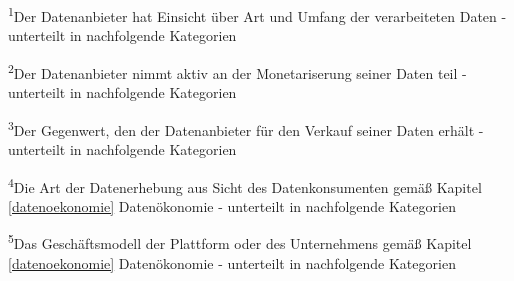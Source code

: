 \noindent \textsuperscript{1}Der Datenanbieter hat Einsicht über Art und Umfang der verarbeiteten Daten - unterteilt in nachfolgende Kategorien \newline

\noindent \textsuperscript{2}Der Datenanbieter nimmt aktiv an der Monetariserung seiner Daten teil - unterteilt in nachfolgende Kategorien \newline

\noindent \textsuperscript{3}Der Gegenwert, den der Datenanbieter für den Verkauf seiner Daten erhält - unterteilt in nachfolgende Kategorien\newline

\noindent \textsuperscript{4}Die Art der Datenerhebung aus Sicht des Datenkonsumenten gemäß Kapitel \ref{datenoekonomie} Datenökonomie - unterteilt in nachfolgende Kategorien\newline

\noindent \textsuperscript{5}Das Geschäftsmodell der Plattform oder des Unternehmens gemäß Kapitel \ref{datenoekonomie} Datenökonomie - unterteilt in nachfolgende Kategorien\newline
